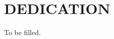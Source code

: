 %
%
%

\chapter*{\texorpdfstring{\MakeUppercase{DEDICATION}}{DEDICATION}}

To be filled.

\pagebreak{}
